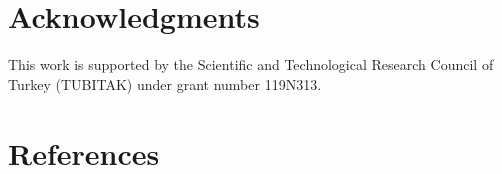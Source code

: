 \documentclass[9pt]{extarticle}
\begin{document}
{}



\maketitle
\begin{abstract}
  
\end{abstract}





\FloatBarrier












\section{Acknowledgments}
This work is supported by the Scientific and Technological
Research Council of Turkey (TUBITAK) under grant number
119N313.

\section{References}




%
\end{document}
